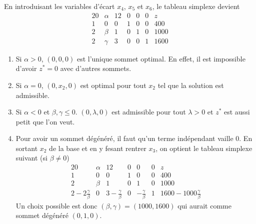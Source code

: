 \begin{enumerate}
    \begin{solution}
      En introduisant les variables d'écart $x_4$, $x_5$ et $x_6$,
      le tableau simplexe devient
      \[
        \begin{array}{cccccc|l}
          20 & \alpha & 12 & 0 & 0 & 0 & z\\
          \hline
           1 & 0      &  0 & 1 & 0 & 0 & 400\\
           2 & \beta  &  1 & 0 & 1 & 0 & 1000\\
           2 & \gamma &  3 & 0 & 0 & 1 & 1600
        \end{array}
      \]
      \begin{enumerate}
        \item Si $\alpha > 0$, $(0,0,0)$ est l'unique sommet optimal.
          En effet, il est impossible d'avoir $z^* = 0$ avec d'autres sommets.
        \item Si $\alpha = 0$, $(0,x_2,0)$ est optimal pour tout $x_2$
          tel que la solution est admissible.
        \item Si $\alpha < 0$ et $\beta,\gamma \leq 0$.
          $(0,\lambda,0)$ est admissible pour tout $\lambda > 0$ et
          $z^*$ est aussi petit que l'on veut.
        \item Pour avoir un sommet dégénéré, il faut qu'un terme indépendant
          vaille 0.
          En sortant $x_2$ de la base et en y fesant rentrer $x_3$, on
          optient le tableau simplexe suivant (si $\beta \neq 0$)
          \[
            \begin{array}{cccccc|l}
              20 & \alpha & 12 & 0 & 0 & 0 & z\\
              \hline
              1 & 0      &  0 & 1 & 0 & 0 & 400\\
              2 & \beta  &  1 & 0 & 1 & 0 & 1000\\
              2-2\frac{\gamma}{\beta} & 0
              & 3-\frac{\gamma}{\beta} & 0 & -\frac{\gamma}{\beta} & 1
              & 1600 - 1000\frac{\gamma}{\beta}
            \end{array}
          \]
          Un choix possible est donc $(\beta,\gamma) = (1000,1600)$
          qui aurait comme sommet dégénéré $(0,1,0)$.
      \end{enumerate}
    \end{solution}


\end{enumerate}
